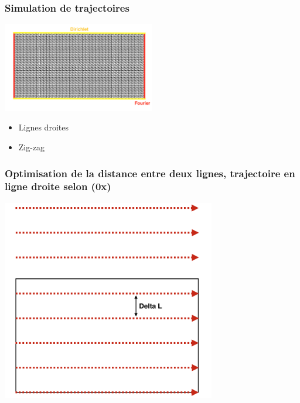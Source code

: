 \documentclass{beamer}
\begin{document}
	\begin{frame}
		\frametitle{Simulation de trajectoires}
		
		\centering
		\includegraphics[width=0.5\textwidth]{rectangleTraj}
		
		\begin{itemize}
			\item Lignes droites
			\item Zig-zag
		\end{itemize}
		
	\end{frame}
	
	\begin{frame}
		\frametitle{Optimisation de la distance entre deux lignes, trajectoire en ligne droite selon (0x)}
		\includegraphics[width=0.7\textwidth]{lignesDroite}
	\end{frame}
	
\end{document}
